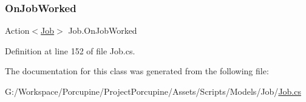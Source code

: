 \subsubsection{\texorpdfstring{On\+Job\+Worked}{OnJobWorked}}
{\footnotesize\ttfamily Action$<$\hyperlink{class_job}{Job}$>$ Job.\+On\+Job\+Worked}



Definition at line 152 of file Job.\+cs.



The documentation for this class was generated from the following file\+:\begin{DoxyCompactItemize}
\item 
G\+:/\+Workspace/\+Porcupine/\+Project\+Porcupine/\+Assets/\+Scripts/\+Models/\+Job/\hyperlink{_job_8cs}{Job.\+cs}\end{DoxyCompactItemize}
